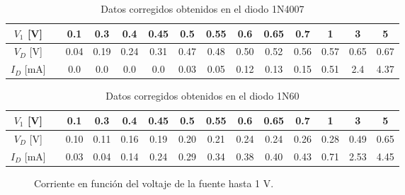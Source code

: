 \begin{table}[H]
\centering
\begin{tabular}{|c|m{0.7cm}|c|c|c|c|c|c|c|c|c|c|c|c|}
  \hline
  $V_1$ [V]   & \centering 0 & 0.1 & 0.3 & 0.4 & 0.45 & 0.5 & 0.55 & 0.6 & 0.65 & 0.7 & 1 & 3 & 5 \\
  \hline
  $V_D$ [V]   & \centering 0 & 0.04 & 0.19 & 0.24 & 0.31 & 0.47 & 0.48 & 0.50 & 0.52 & 0.56 & 0.57 & 0.65 & 0.67 \\
  \hline
  $I_D$ [mA]  & \centering 0 & 0.0 & 0.0 & 0.0 & 0.0 & 0.03 & 0.05 & 0.12 & 0.13 & 0.15 & 0.51 & 2.4  & 4.37      \\
  \hline
\end{tabular}
\caption{Datos corregidos obtenidos en el diodo 1N4007}
\label{tab:diodo-1n4007}
\end{table}

\vspace{1cm}

\begin{table}[H]
\centering
\begin{tabular}{|c|m{0.7cm}|c|c|c|c|c|c|c|c|c|c|c|c|}
  \hline
  $V_1$ [V]   & \centering 0 & 0.1 & 0.3 & 0.4 & 0.45 & 0.5 & 0.55 & 0.6 & 0.65 & 0.7 & 1 & 3 & 5 \\
  \hline
  $V_D$ [V]   & \centering 0 & 0.10 & 0.11 & 0.16 & 0.19 & 0.20 & 0.21 & 0.24 & 0.24 & 0.26 & 0.28 & 0.49 & 0.65 \\
  \hline
  $I_D$ [mA]  & \centering 0 & 0.03 & 0.04 & 0.14 & 0.24 & 0.29 & 0.34 & 0.38 & 0.40 & 0.43 & 0.71 & 2.53 & 4.45 \\
  \hline
\end{tabular}
\caption{Datos corregidos obtenidos en el diodo 1N60}
\label{tab:diodo-datos}
\end{table}

\begin{figure}[H]
\centering
{}
\caption{Corriente en función del voltaje de la fuente hasta 1 V.}
\label{fig:IV_1V}
\end{figure}

